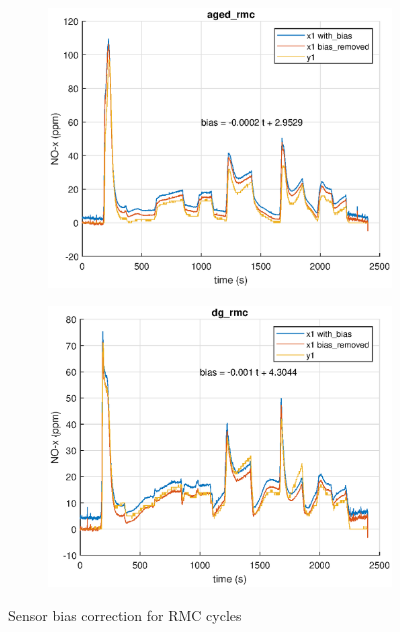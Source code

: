 \begin{figure}[H]
    \begin{minipage}{0.49\textwidth}
        \begin{figure}[H]
            \includegraphics[width=\textwidth]{./figs/chi_est/aged_rmc_NOx_bias.eps}
        \end{figure}
    \end{minipage}
    \begin{minipage}{0.49\textwidth}
        \begin{figure}[H]
            \includegraphics[width=\textwidth]{./figs/chi_est/dg_rmc_NOx_bias.eps}
        \end{figure}
    \end{minipage}
        \caption{Sensor bias correction for RMC cycles}
\end{figure}




